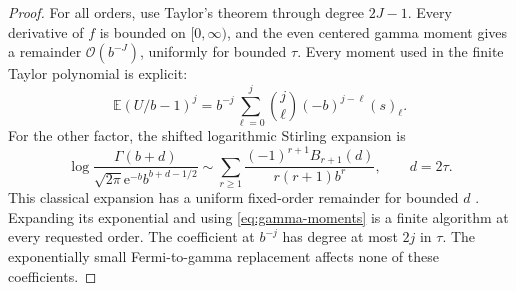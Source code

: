 \documentclass[11pt,a4paper]{article}
\theoremstyle{definition}
\numberwithin{equation}{section}
\newcommand{\ee}{\mathrm{e}}
\newcommand{\Oh}{\mathcal O}
\newcommand{\rising}[2]{(#1)_{#2}}
\begin{document}
\begin{proof}
For all orders, use Taylor's theorem through degree $2J-1$. Every derivative of $f$ is bounded on $[0,\infty)$, and the even centered gamma moment gives a remainder $\Oh(b^{-J})$, uniformly for bounded $\tau$. Every moment used in the finite Taylor polynomial is explicit:
\begin{equation}
 \mathbb E(U/b-1)^j
 =b^{-j}\sum_{\ell=0}^j
       \binom j\ell(-b)^{j-\ell}\rising{s}{\ell}.
 \label{eq:gamma-moments}
\end{equation}
For the other factor, the shifted logarithmic Stirling expansion is
\begin{equation}
 \log\frac{\Gamma(b+d)}{\sqrt{2\pi}\ee^{-b}b^{b+d-1/2}}
 \sim\sum_{r\ge1}\frac{(-1)^{r+1}B_{r+1}(d)}{r(r+1)b^r},
 \qquad d=2\tau.
 \label{eq:shifted-stirling}
\end{equation}
This classical expansion has a uniform fixed-order remainder for bounded $d$ \cite{dlmf}. Expanding its exponential and using \eqref{eq:gamma-moments} is a finite algorithm at every requested order. The coefficient at $b^{-j}$ has degree at most $2j$ in $\tau$. The exponentially small Fermi-to-gamma replacement affects none of these coefficients.
\end{proof}
\end{document}
